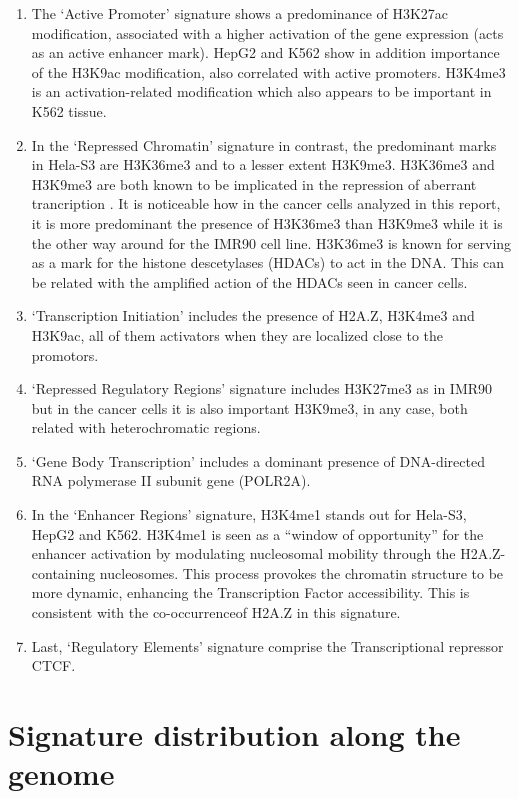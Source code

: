 \begin{enumerate}
    \item The `Active Promoter' signature shows a predominance of H3K27ac modification, associated with a higher activation of the gene expression (acts as an active enhancer mark). HepG2 and K562 show in addition importance of the H3K9ac modification, also correlated with active promoters. H3K4me3 is an activation-related modification which also appears to be important in K562 tissue.
    \item In the `Repressed Chromatin' signature in contrast, the predominant marks in Hela-S3 are H3K36me3 and to a lesser extent H3K9me3. H3K36me3 and H3K9me3 are both known to be implicated in the repression of aberrant trancription \cite{Bartke2010}. It is noticeable how in the cancer cells analyzed in this report, it is more predominant the presence of H3K36me3 than H3K9me3 while it is the other way around for the IMR90 cell line. H3K36me3 is known for serving as a mark for the histone descetylases (HDACs) to act in the DNA. This can be related with the amplified action of the HDACs seen in cancer cells.
    \item `Transcription Initiation' includes the presence of H2A.Z, H3K4me3 and H3K9ac, all of them activators when they are localized close to the promotors.
    \item `Repressed Regulatory Regions' signature includes H3K27me3 as in IMR90 but in the cancer cells it is also important H3K9me3, in any case, both related with heterochromatic regions.
    \item `Gene Body Transcription' includes a dominant presence of DNA-directed RNA polymerase II subunit gene (POLR2A).
    \item In the `Enhancer Regions' signature, H3K4me1 stands out for Hela-S3, HepG2 and K562. H3K4me1 is seen as a ``window of opportunity'' for the enhancer activation by modulating nucleosomal mobility through the H2A.Z-containing nucleosomes. This process provokes the chromatin structure to be more dynamic, enhancing the Transcription Factor accessibility. This is consistent with the co-occurrenceof H2A.Z in this signature.
    \item Last, `Regulatory Elements' signature comprise the Transcriptional repressor CTCF.
\end{enumerate}

\section{Signature distribution along the genome}

